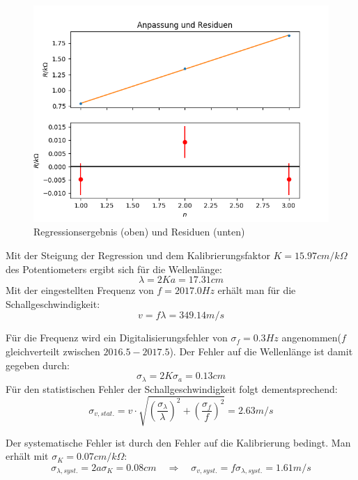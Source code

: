 \documentclass[12pt,a4paper]{article}
\begin{document}
\begin{figure}
	\includegraphics[width=\linewidth]{fitdruckknoten}
	\caption[Regression Knoten]{Regressionsergebnis (oben) und Residuen (unten)}
	\label{fig:Regression Druckverlauf}
\end{figure}

Mit der Steigung der Regression und dem Kalibrierungsfaktor $K=15.97 cm/k\Omega$ des Potentiometers ergibt sich für die Wellenlänge:
\begin{equation}
\lambda=2Ka=17.31cm
\end{equation}
Mit der eingestellten Frequenz von $f=2017.0Hz$ erhält man für die Schallgeschwindigkeit:
\begin{equation}
v=f \lambda = 349.14m/s
\end{equation}

Für die Frequenz wird ein Digitalisierungsfehler von $\sigma_f=0.3Hz$ angenommen($f$ gleichverteilt zwischen $2016.5-2017.5$). Der Fehler auf die Wellenlänge ist damit gegeben durch:
\begin{equation}
\sigma_{\lambda}=2K \sigma_a=0.13cm
\end{equation}
Für den statistischen Fehler der Schallgeschwindigkeit folgt dementsprechend:
\begin{equation}
\sigma_{v,stat.}=v \cdot \sqrt{(\frac{\sigma_{\lambda}}{\lambda})^2+(\frac{\sigma_f}{f})^2}=2.63m/s
\end{equation}

Der systematische Fehler ist durch den Fehler auf die Kalibrierung bedingt. Man erhält mit $\sigma_K=0.07cm/k\Omega$:
\begin{equation}
\sigma_{\lambda,syst.}=2a \sigma_K=0.08cm \quad \Rightarrow \quad \sigma_{v,syst.}=f \sigma_{\lambda,syst.}=1.61m/s
\end{equation}
\end{document}
